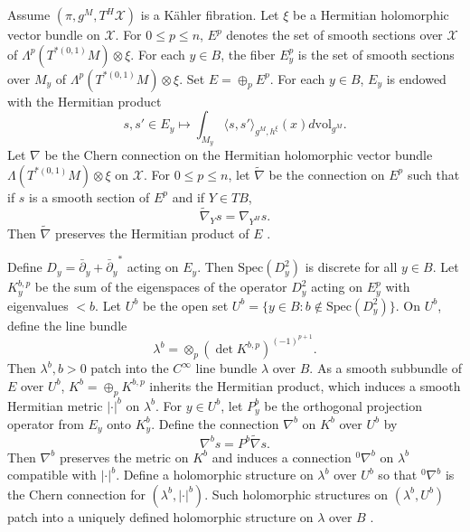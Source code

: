 \documentclass[12pt,reqno,a4paper]{amsart}
\numberwithin{equation}{section}
\theoremstyle{definition}
\theoremstyle{remark}
\begin{document}
Assume $(\pi,g^M,T^H\mathcal{X})$ is a K\"ahler fibration. Let $\xi$ be a Hermitian holomorphic vector bundle on $\mathcal{X}$. For $0\leq p\leq n$, $E^p$ denotes the set of smooth sections over $\mathcal{X}$ of $\Lambda^p(T^{*(0,1)}M)\otimes\xi$. For each $y\in B$, the fiber $E^p_y$ is the set of smooth sections over $M_y$ of $\Lambda^p(T^{*(0,1)}M)\otimes\xi$. Set $E=\oplus_p E^p$. For each $y\in B$, $E_y$ is endowed with the Hermitian product
\begin{equation*}
s,s'\in E_y \mapsto \int_{M_y}\langle s,s'\rangle_{g^M,h^{\xi}}(x)d\mathrm{vol}_{g^M}.
\end{equation*}
Let $\nabla$ be the Chern connection on the Hermitian holomorphic vector bundle $\Lambda(T^{*(0,1)}M)\otimes\xi$ on $\mathcal{X}$. For $0\leq p \leq n$, let $\widetilde{\nabla}$ be the connection on $E^p$ such that if $s$ is a smooth section of $E^p$ and if $Y\in TB$,
\begin{equation*}
\widetilde{\nabla}_Y s = \nabla_{Y^H} s.
\end{equation*}
Then $\widetilde{\nabla}$ preserves the Hermitian product of $E$ \cite[Theorem 1.14]{bismut1988analytic2}.

Define $D_y=\bar{\partial}_y+{\bar{\partial}_y}^*$ acting on $E_y$. Then $\mathrm{Spec}(D_y^2)$ is discrete for all $y\in B$. Let $K^{b,p}_y$ be the sum of the eigenspaces of the operator $D^2_y$ acting on $E^p_y$ with eigenvalues $<b$. Let $U^b$ be the open set $U^b=\{ y\in B : b\notin \mathrm{Spec}(D_y^2) \}$. On $U^b$, define the line bundle \begin{equation*}
\lambda^b=\otimes_p (\det K^{b,p})^{(-1)^{p+1}}.
\end{equation*}
Then $\lambda^b, b>0$ patch into the $C^\infty$ line bundle $\lambda$ over $B$. As a smooth subbundle of $E$ over $U^b$, $K^b=\oplus_p K^{b,p}$ inherits the Hermitian product, which induces a smooth Hermitian metric $|\cdot|^b$ on $\lambda^b$. For $y\in U^b$, let $P^b_y$ be the orthogonal projection operator from $E_y$ onto $K^b_y$. Define the connection $\nabla^b$ on $K^b$ over $U^b$ by
\begin{equation*}
\nabla^b s=P^b \widetilde{\nabla} s.
\end{equation*}
Then $\nabla^b$ preserves the metric on $K^b$ and induces a connection ${}^0\nabla^b$ on $\lambda^b$ compatible with $|\cdot|^b$. Define a holomorphic structure on $\lambda^b$ over $U^b$ so that ${}^0\nabla^b$ is the Chern connection for $(\lambda^b,|\cdot|^b)$. Such holomorphic structures on $(\lambda^b,U^b)$ patch into a uniquely defined holomorphic structure on $\lambda$ over $B$ \cite[Theorem 1.3]{bismut1988analytic3}.
\end{document}
